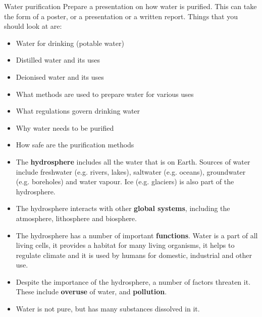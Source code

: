 \label{m38138*id672214}
            \begin{project}{Water purification}
            \nopagebreak
\label{m38138*id97324}
Prepare a presentation on how water is purified. This can take the form of a poster, or a presentation or a written report. Things that you should look at are:
\label{m38138*id097324}\begin{itemize}[noitemsep]
            \item Water for drinking (potable water)\item Distilled water and its uses\item Deionised water and its uses\item What methods are used to prepare water for various uses\item What regulations govern drinking water\item Why water needs to be purified\item How safe are the purification methods\end{itemize}
\par 
\end{project}
            \nopagebreak
      \label{m38138*id342453}\begin{itemize}[noitemsep]
            \label{m38138*uid92}\item The \textbf{hydrosphere} includes all the water that is on Earth. Sources of water include freshwater (e.g.\@{} rivers, lakes), saltwater (e.g.\@{} oceans), groundwater (e.g.\@{} boreholes) and water vapour. Ice (e.g.\@{} glaciers) is also part of the hydrosphere.
\label{m38138*uid93}\item The hydrosphere interacts with other \textbf{global systems}, including the atmosphere, lithosphere and biosphere.
\label{m38138*uid94}\item The hydrosphere has a number of important \textbf{functions}. Water is a part of all living cells, it provides a habitat for many living organisms, it helps to regulate climate and it is used by humans for domestic, industrial and other use.
\label{m38138*uid106}\item Despite the importance of the hydrosphere, a number of factors threaten it. These include \textbf{overuse} of water, and \textbf{pollution}.
\item Water is not pure, but has many substances dissolved in it. 
\end{itemize}
